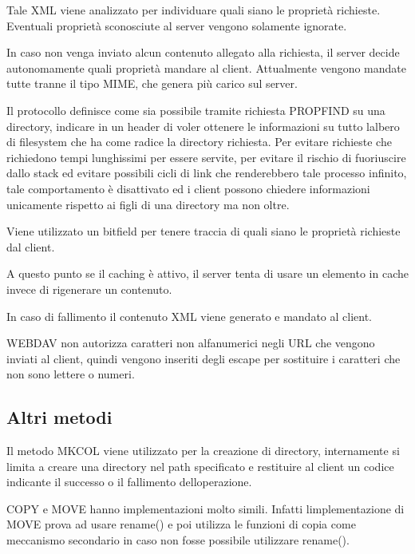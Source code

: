 \documentclass[a4paper,11pt]{article}
\begin{document}
{\sffamily
Tale XML viene analizzato per individuare quali siano le propriet\`a
richieste. Eventuali propriet\`a sconosciute al server vengono
solamente ignorate.}

{\sffamily
In caso non venga inviato alcun contenuto allegato alla richiesta, il
server decide autonomamente quali propriet\`a mandare al client.
Attualmente vengono mandate tutte tranne il tipo MIME, che genera pi\`u
carico sul server.}

{\sffamily
Il protocollo definisce come sia possibile tramite richiesta PROPFIND su
una directory, indicare in un header di voler ottenere le informazioni
su tutto l{\textquotesingle}albero di filesystem che ha come radice la
directory richiesta. Per evitare richieste che richiedono tempi
lunghissimi per essere servite, per evitare il rischio di fuoriuscire
dallo stack ed evitare possibili cicli di link che renderebbero tale
processo infinito, tale comportamento \`e disattivato ed i client
possono chiedere informazioni unicamente rispetto ai figli di una
directory ma non oltre.}


\bigskip

{\sffamily
Viene utilizzato un bitfield per tenere traccia di quali siano le
propriet\`a richieste dal client.}


\bigskip

{\sffamily
A questo punto se il caching \`e attivo, il server tenta di usare un
elemento in cache invece di rigenerare un contenuto.}

{\sffamily
In caso di fallimento il contenuto XML viene generato e mandato al
client.}

{\sffamily
WEBDAV non autorizza caratteri non alfanumerici negli URL che vengono
inviati al client, quindi vengono inseriti degli escape per sostituire
i caratteri che non sono lettere o numeri\cite{STD02}.}


\bigskip

\subsection{Altri metodi}
{\sffamily
Il metodo MKCOL viene utilizzato per la creazione di directory,
internamente si limita a creare una directory nel path specificato e
restituire al client un codice indicante il successo o il fallimento
dell{\textquotesingle}operazione.}


\bigskip

{\sffamily
COPY e MOVE hanno implementazioni molto simili. Infatti
l{\textquotesingle}implementazione di MOVE prova ad usare rename() e
poi utilizza le funzioni di copia come meccanismo secondario in caso
non fosse possibile utilizzare rename().}
\end{document}
